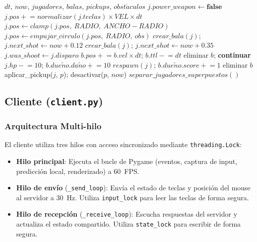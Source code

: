 \documentclass[conference]{IEEEtran}
\begin{document}
\begin{algorithm}[htbp]
\caption{update\_game (servidor)}
\label{alg:physics}
\begin{algorithmic}[1]
\Require $dt$, $now$, $jugadores$, $balas$, $pickups$, $obst\acute{a}culos$
    \State $j.power\_weapon \gets \textbf{false}$
  \EndIf
  \State $j.pos \mathrel{+}= normalizar(j.teclas) \times VEL \times dt$
  \State $j.pos \gets clamp(j.pos,\ RADIO,\ ANCHO - RADIO)$
    \State $j.pos \gets empujar\_circulo(j.pos,\ RADIO,\ obs)$
  \EndFor
    \State $crear\_bala(j)$; $j.next\_shot \gets now + 0.12$
    \State $crear\_bala(j)$; $j.next\_shot \gets now + 0.35$
  \EndIf
  \State $j.was\_shoot \gets j.disparo$
\EndFor
{}
  \State $b.pos \mathrel{+}= b.vel \times dt$; $b.ttl \mathrel{-}= dt$
    \State eliminar $b$; \textbf{continuar}
  \EndIf
      \State $j.hp \mathrel{-}= 10$; $b.due\tilde{n}o.da\tilde{n}o \mathrel{+}= 10$
        \State $respawn(j)$; $b.due\tilde{n}o.score \mathrel{+}= 1$
      \EndIf
      \State eliminar $b$
    \EndIf
  \EndFor
\EndFor
{}
      \State aplicar\_pickup($j$, $p$); desactivar($p$, $now$)
    \EndIf
  \EndFor
\EndFor
\State $separar\_jugadores\_superpuestos()$
\end{algorithmic}
\end{algorithm}

\subsection{Cliente (\texttt{client.py})}

\subsubsection{Arquitectura Multi-hilo}

El cliente utiliza tres hilos con acceso sincronizado mediante \texttt{threading.Lock}:

\begin{itemize}
    \item \textbf{Hilo principal}: Ejecuta el bucle de Pygame (eventos, captura de input, predicci\'on local, renderizado) a 60~FPS.
    \item \textbf{Hilo de env\'io} (\texttt{\_send\_loop}): Env\'ia el estado de teclas y posici\'on del mouse al servidor a 30~Hz. Utiliza \texttt{input\_lock} para leer las teclas de forma segura.
    \item \textbf{Hilo de recepci\'on} (\texttt{\_receive\_loop}): Escucha respuestas del servidor y actualiza el estado compartido. Utiliza \texttt{state\_lock} para escribir de forma segura.
\end{itemize}
\end{document}
